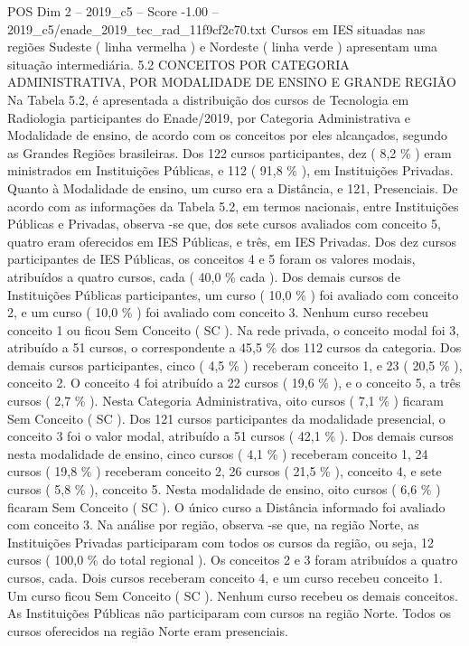 \begin{textsample}{POS Dim 2 – 2019\_c5 – Score -1.00 – 2019\_c5/enade\_2019\_tec\_rad\_11f9cf2c70.txt}
Cursos em IES situadas nas regiões Sudeste ( linha vermelha ) e Nordeste ( linha verde ) apresentam uma situação intermediária. 5.2 CONCEITOS POR CATEGORIA ADMINISTRATIVA, POR MODALIDADE DE ENSINO E GRANDE REGIÃO Na Tabela 5.2, é apresentada a distribuição dos cursos de Tecnologia em Radiologia participantes do Enade/2019, por Categoria Administrativa e Modalidade de ensino, de acordo com os conceitos por eles alcançados, segundo as Grandes Regiões brasileiras.
Dos 122 cursos participantes, dez ( 8,2 \% ) eram ministrados em Instituições Públicas, e 112 ( 91,8 \% ), em Instituições Privadas.
Quanto à Modalidade de ensino, um curso era a Distância, e 121, Presenciais.
De acordo com as informações da Tabela 5.2, em termos nacionais, entre Instituições Públicas e Privadas, observa -se que, dos sete cursos avaliados com conceito 5, quatro eram oferecidos em IES Públicas, e três, em IES Privadas.
Dos dez cursos participantes de IES Públicas, os conceitos 4 e 5 foram os valores modais, atribuídos a quatro cursos, cada ( 40,0 \% cada ).
Dos demais cursos de Instituições Públicas participantes, um curso ( 10,0 \% ) foi avaliado com conceito 2, e um curso ( 10,0 \% ) foi avaliado com conceito 3.
Nenhum curso recebeu conceito 1 ou ficou Sem Conceito ( SC ).
Na rede privada, o conceito modal foi 3, atribuído a 51 cursos, o correspondente a 45,5 \% dos 112 cursos da categoria.
Dos demais cursos participantes, cinco ( 4,5 \% ) receberam conceito 1, e 23 ( 20,5 \% ), conceito 2.
O conceito 4 foi atribuído a 22 cursos ( 19,6 \% ), e o conceito 5, a três cursos ( 2,7 \% ).
Nesta Categoria Administrativa, oito cursos ( 7,1 \% ) ficaram Sem Conceito ( SC ).
Dos 121 cursos participantes da modalidade presencial, o conceito 3 foi o valor modal, atribuído a 51 cursos ( 42,1 \% ).
Dos demais cursos nesta modalidade de ensino, cinco cursos ( 4,1 \% ) receberam conceito 1, 24 cursos ( 19,8 \% ) receberam conceito 2, 26 cursos ( 21,5 \% ), conceito 4, e sete cursos ( 5,8 \% ), conceito 5.
Nesta modalidade de ensino, oito cursos ( 6,6 \% ) ficaram Sem Conceito ( SC ).
O único curso a Distância informado foi avaliado com conceito 3.
Na análise por região, observa -se que, na região Norte, as Instituições Privadas participaram com todos os cursos da região, ou seja, 12 cursos ( 100,0 \% do total regional ).
Os conceitos 2 e 3 foram atribuídos a quatro cursos, cada.
Dois cursos receberam conceito 4, e um curso recebeu conceito 1.
Um curso ficou Sem Conceito ( SC ).
Nenhum curso recebeu os demais conceitos.
As Instituições Públicas não participaram com cursos na região Norte.
Todos os cursos oferecidos na região Norte eram presenciais.

\end{textsample}
